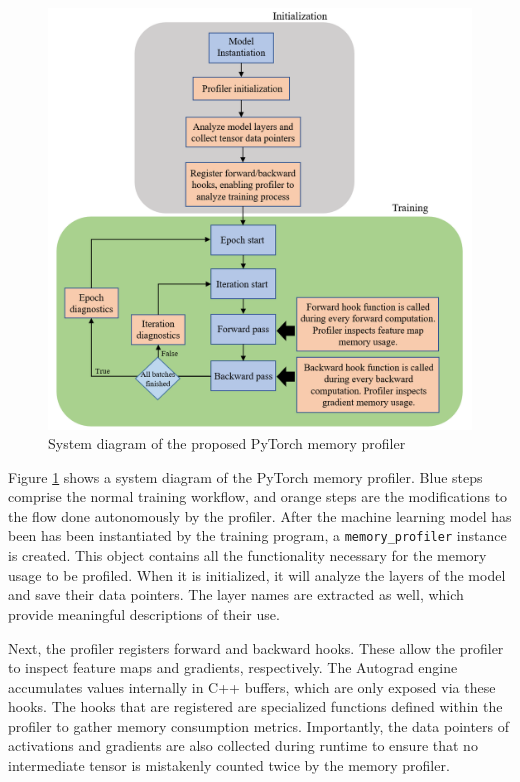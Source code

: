 \documentclass[12pt,letterpaper]{article}
\begin{document}
\begin{figure}[ht]
\centering
\includegraphics[width=1.0\textwidth]{profiler_system_diagram.PNG}
\captionsetup{width=0.9\linewidth}
\caption{System diagram of the proposed PyTorch memory profiler}
\label{fig:profiler_system_diagram}
\end{figure}

Figure \ref{fig:profiler_system_diagram} shows a system diagram of the PyTorch memory profiler. Blue steps comprise the normal training workflow, and orange steps are the modifications to the flow done autonomously by the profiler. After the machine learning model has been has been instantiated by the training program, a \texttt{memory\_profiler} instance is created. This object contains all the functionality necessary for the memory usage to be profiled. When it is initialized, it will analyze the layers of the model and save their data pointers. The layer names are extracted as well, which provide meaningful descriptions of their use. \par 

Next, the profiler registers forward and backward hooks. These allow the profiler to inspect feature maps and gradients, respectively. The Autograd engine accumulates values internally in C++ buffers, which are only exposed via these hooks. The hooks that are registered are specialized functions defined within the profiler to gather memory consumption metrics. Importantly, the data pointers of activations and gradients are also collected during runtime to ensure that no intermediate tensor is mistakenly counted twice by the memory profiler. \par 
\end{document}
